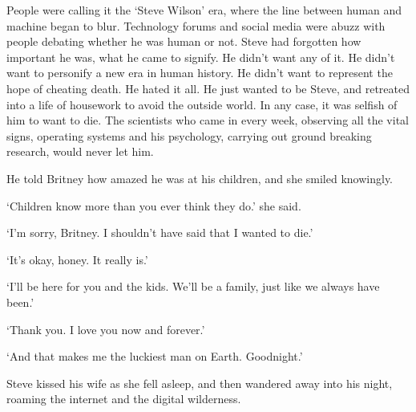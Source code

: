 People were calling it the `Steve Wilson' era, where the line between human and machine began to blur. Technology forums and social media were abuzz with people debating whether he was human or not. Steve had forgotten how important he was, what he came to signify. He didn't want any of it. He didn't want to personify a new era in human history. He didn't want to represent the hope of cheating death. He hated it all. He just wanted to be Steve, and retreated into a life of housework to avoid the outside world. In any case, it was selfish of him to want to die. The scientists who came in every week, observing all the vital signs, operating systems and his psychology, carrying out ground breaking research, would never let him.

He told Britney how amazed he was at his children, and she smiled knowingly.

`Children know more than you ever think they do.' she said.

`I'm sorry, Britney. I shouldn't have said that I wanted to die.'

`It's okay, honey. It really is.'

`I'll be here for you and the kids. We'll be a family, just like we always have been.'

`Thank you. I love you now and forever.'

`And that makes me the luckiest man on Earth. Goodnight.' 

Steve kissed his wife as she fell asleep, and then wandered away into his night, roaming the internet and the digital wilderness.
